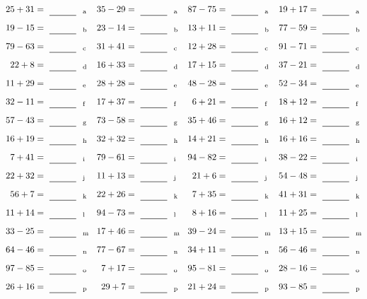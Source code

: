 \documentclass
[
  draft    = true,
  fontsize = 11pt,
  parskip  = half-
]
{scrartcl}
\begin{document}
\clearpage
\begin{align*}
    \pline{25+31}&=\rline{a}
  & \pline{35-29}&=\rline{a}
  & \pline{87-75}&=\rline{a}
  & \pline{19+17}&=\rline{a} \\[1ex]
    \pline{19-15}&=\rline{b}
  & \pline{23-14}&=\rline{b}
  & \pline{13+11}&=\rline{b}
  & \pline{77-59}&=\rline{b} \\[1ex]
    \pline{79-63}&=\rline{c}
  & \pline{31+41}&=\rline{c}
  & \pline{12+28}&=\rline{c}
  & \pline{91-71}&=\rline{c} \\[1ex]
    \pline{22+8}&=\rline{d}
  & \pline{16+33}&=\rline{d}
  & \pline{17+15}&=\rline{d}
  & \pline{37-21}&=\rline{d} \\[1ex]
    \pline{11+29}&=\rline{e}
  & \pline{28+28}&=\rline{e}
  & \pline{48-28}&=\rline{e}
  & \pline{52-34}&=\rline{e} \\[1ex]
    \pline{32-11}&=\rline{f}
  & \pline{17+37}&=\rline{f}
  & \pline{6+21}&=\rline{f}
  & \pline{18+12}&=\rline{f} \\[1ex]
    \pline{57-43}&=\rline{g}
  & \pline{73-58}&=\rline{g}
  & \pline{35+46}&=\rline{g}
  & \pline{16+12}&=\rline{g} \\[1ex]
    \pline{16+19}&=\rline{h}
  & \pline{32+32}&=\rline{h}
  & \pline{14+21}&=\rline{h}
  & \pline{16+16}&=\rline{h} \\[1ex]
    \pline{7+41}&=\rline{i}
  & \pline{79-61}&=\rline{i}
  & \pline{94-82}&=\rline{i}
  & \pline{38-22}&=\rline{i} \\[1ex]
    \pline{22+32}&=\rline{j}
  & \pline{11+13}&=\rline{j}
  & \pline{21+6}&=\rline{j}
  & \pline{54-48}&=\rline{j} \\[1ex]
    \pline{56+7}&=\rline{k}
  & \pline{22+26}&=\rline{k}
  & \pline{7+35}&=\rline{k}
  & \pline{41+31}&=\rline{k} \\[1ex]
    \pline{11+14}&=\rline{l}
  & \pline{94-73}&=\rline{l}
  & \pline{8+16}&=\rline{l}
  & \pline{11+25}&=\rline{l} \\[1ex]
    \pline{33-25}&=\rline{m}
  & \pline{17+46}&=\rline{m}
  & \pline{39-24}&=\rline{m}
  & \pline{13+15}&=\rline{m} \\[1ex]
    \pline{64-46}&=\rline{n}
  & \pline{77-67}&=\rline{n}
  & \pline{34+11}&=\rline{n}
  & \pline{56-46}&=\rline{n} \\[1ex]
    \pline{97-85}&=\rline{o}
  & \pline{7+17}&=\rline{o}
  & \pline{95-81}&=\rline{o}
  & \pline{28-16}&=\rline{o} \\[1ex]
    \pline{26+16}&=\rline{p}
  & \pline{29+7}&=\rline{p}
  & \pline{21+24}&=\rline{p}
  & \pline{93-85}&=\rline{p}
\end{align*}
\end{document}
